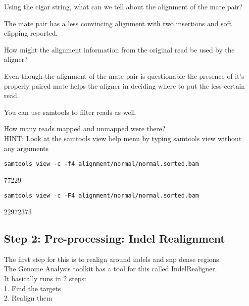 \begin{questions} 
Using the cigar string, what can we tell about the alignment of the mate pair?
\end{questions}
\begin{answer}
The mate pair has a less convincing alignment with two insertions and soft clipping reported.
\end{answer}

\begin{questions} 
How might the alignment information from the original read be used by the aligner?
\end{questions}
\begin{answer}
Even though the alignment of the mate pair is questionable the presence of it's properly paired mate helps the aligner in deciding where to put the less-certain read. 
\end{answer}

You can use samtools to filter reads as well.

\begin{questions} 
How many reads mapped and unmapped were there? \\
HINT: Look at the samtools view help menu by typing samtools view without any arguments
\end{questions}
\begin{answer}
\begin{lstlisting}
samtools view -c -f4 alignment/normal/normal.sorted.bam
\end{lstlisting}
77229
\begin{lstlisting}
samtools view -c -F4 alignment/normal/normal.sorted.bam
\end{lstlisting}
22972373
\end{answer}

\subsection{Step 2: Pre-processing: Indel Realignment}
The first step for this is to realign around indels and snp dense regions.\\
The Genome Analysis toolkit has a tool for this called IndelRealigner. \\
It basically runs in 2 steps: \\
   1. Find the targets \\
   2. Realign them \\


